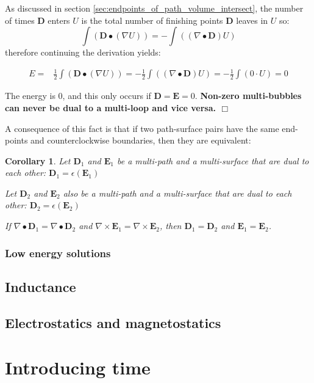 \documentclass{book}
\newtheorem{cor}{Corollary}
\begin{document}
As discussed in section \ref{sec:endpoints_of_path_volume_intersect}, the number of times \(\mathbf{D}\) enters \(U\) is the total number of finishing points \(\mathbf{D}\) leaves in \(U\) so: 
\[\int (\mathbf{D} \bullet (\nabla U)) = -\int ((\nabla \bullet \mathbf{D}) U)\] 
therefore continuing the derivation yields:

\begin{align*}
E = & \frac{1}{2} \int (\mathbf{D} \bullet (\nabla U)) 
= -\frac{1}{2} \int ((\nabla \bullet \mathbf{D}) U) 
= -\frac{1}{2} \int (0 \cdot U) 
= 0
\end{align*}

The energy is \(0\), and this only occurs if \(\mathbf{D} = \mathbf{E} = 0\). {\bf Non-zero multi-bubbles can never be dual to a multi-loop and vice versa. \(\Box\)}


A consequence of this fact is that if two path-surface pairs have the same end-points and counterclockwise boundaries, then they are equivalent: 

\begin{cor}
Let \(\mathbf{D}_1\) and \(\mathbf{E}_1\) be a multi-path and a multi-surface that are dual to each other: \(\mathbf{D}_1 = \epsilon(\mathbf{E}_1)\)

Let \(\mathbf{D}_2\) and \(\mathbf{E}_2\) also be a multi-path and a multi-surface that are dual to each other: \(\mathbf{D}_2 = \epsilon(\mathbf{E}_2)\)

If \(\nabla \bullet \mathbf{D}_1 = \nabla \bullet \mathbf{D}_2\) and \(\nabla \times \mathbf{E}_1 = \nabla \times \mathbf{E}_2\), then \(\mathbf{D}_1 = \mathbf{D}_2\) and \(\mathbf{E}_1 = \mathbf{E}_2\).   
\end{cor}




\subsection{Low energy solutions}




\section{Inductance}



\section{Electrostatics and magnetostatics}





\chapter{Introducing time}
\end{document}
